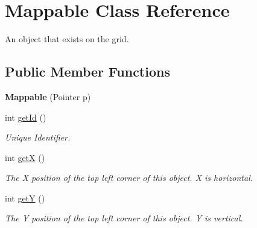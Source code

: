 \hypertarget{classMappable}{
\section{Mappable Class Reference}
\label{classMappable}
}


An object that exists on the grid.  


\subsection*{Public Member Functions}
\begin{DoxyCompactItemize}
\item 
\hypertarget{classMappable_a1bdab2bd76367e1036eb977569779ec1}{
{\bfseries Mappable} (Pointer p)}
\label{classMappable_a1bdab2bd76367e1036eb977569779ec1}

\item 
\hypertarget{classMappable_ad5dd27011d5cb4682b811eb72dfeafa1}{
int \hyperlink{classMappable_ad5dd27011d5cb4682b811eb72dfeafa1}{getId} ()}
\label{classMappable_ad5dd27011d5cb4682b811eb72dfeafa1}

\begin{DoxyCompactList}\small\item\em Unique Identifier. \item\end{DoxyCompactList}\item 
\hypertarget{classMappable_a2f684a8678c19323e45eac3c9935e0ff}{
int \hyperlink{classMappable_a2f684a8678c19323e45eac3c9935e0ff}{getX} ()}
\label{classMappable_a2f684a8678c19323e45eac3c9935e0ff}

\begin{DoxyCompactList}\small\item\em The X position of the top left corner of this object. X is horizontal. \item\end{DoxyCompactList}\item 
\hypertarget{classMappable_a1f5e30764a9bbf0008690c11071ddfd9}{
int \hyperlink{classMappable_a1f5e30764a9bbf0008690c11071ddfd9}{getY} ()}
\label{classMappable_a1f5e30764a9bbf0008690c11071ddfd9}

\begin{DoxyCompactList}\small\item\em The Y position of the top left corner of this object. Y is vertical. \item\end{DoxyCompactList}\end{DoxyCompactItemize}

